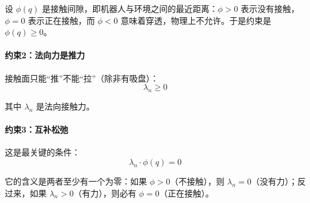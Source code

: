 设 $\phi(q)$ 是接触间隙，即机器人与环境之间的最近距离：$\phi > 0$ 表示没有接触，$\phi = 0$ 表示正在接触，而 $\phi < 0$ 意味着穿透，物理上不允许。于是约束是 $\phi(q) \geq 0$。

\paragraph{约束2：法向力是推力}

接触面只能“推”不能“拉”（除非有吸盘）：
\[
\lambda_n \geq 0
\]

其中 $\lambda_n$ 是法向接触力。

\paragraph{约束3：互补松弛}

这是最关键的条件：
\[
\lambda_n \cdot \phi(q) = 0
\]

它的含义是两者至少有一个为零：如果 $\phi > 0$（不接触），则 $\lambda_n = 0$（没有力）；反过来，如果 $\lambda_n > 0$（有力），则必有 $\phi = 0$（正在接触）。

